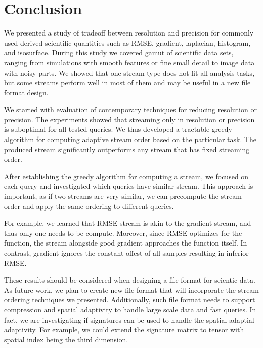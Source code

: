 \section{Conclusion}
We presented a study of tradeoff between resolution and precision for commonly used derived
scientific quantities such as RMSE, gradient, laplacian, histogram, and isosurface.
During this study we covered gamut of scientific data sets, ranging from simulations
with smooth features or fine small detail to image data with noisy parts.
We showed that one stream type does not fit all analysis tasks, but some streams perform well
in most of them and may be useful in a new file format design.





We started with evaluation of contemporary techniques for reducing resolution or precision.
The experiments showed that streaming only in resolution or precision is suboptimal for all
tested queries. We thus developed a tractable greedy algorithm for computing adaptive stream order
based on the particular task. The produced stream significantly outperforms any stream that has
fixed streaming order.

After establishing the greedy algorithm for computing a stream, we focused on each query and
investigated which queries have similar stream. This approach is important, as if two streams
are very similar, we can precompute the stream order and apply the same ordering to different
queries.

For example, we learned that RMSE stream is akin to the gradient stream, and thus only one
needs to be compute. Moreover, since RMSE optimizes for the function, the stream alongside
good gradient approaches the function itself. In contrast, gradient ignores the constant offest
of all samples resulting in inferior RMSE.


These results should be considered when designing a file format for scientic data. As future work,
we plan to create new file format that will incorporate the stream ordering techniques we presented.
Additionally, such file format needs to support compression and spatial adaptivity to handle large
scale data and fast queries. In fact, we are investigating if signatures can be used to handle
the spatial adaptial adaptivity. For example, we could extend the signature matrix to tensor with
spatial index being the third dimension.



